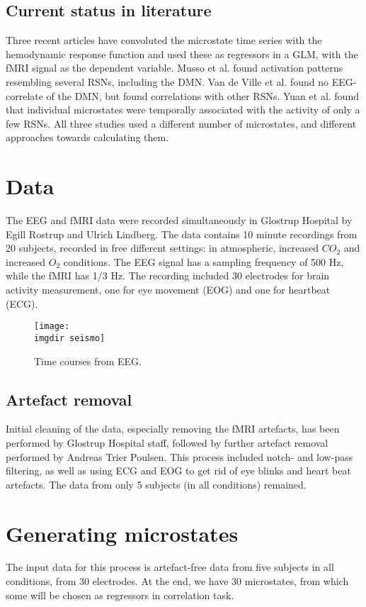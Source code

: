 \documentclass{article}
\newcommand{\imgdir}{Images/} %
\begin{document}
\subsection{Current status in literature}
Three recent articles have convoluted the microstate time series with the hemodynamic response function and used these as regressors in a GLM, with the fMRI signal as the dependent variable. Musso et al. found activation patterns resembling several RSNs, including the DMN. Van de Ville et al. found no EEG-correlate of the DMN, but found correlations with other RSNs. Yuan et al. found that individual microstates were temporally associated with the activity of only a few RSNs. All three studies used a different number of microstates, and different approaches towards calculating them.


\section{Data}
\label{sec:data}

The EEG and fMRI data were recorded simultaneously in Glostrup Hospital by Egill Rostrup and Ulrich Lindberg.
The data contains 10 minute recordings from 20 subjects, recorded in free different settings: in atmospheric, increased $CO_2$ and increased $O_2$ conditions. The EEG signal has a sampling frequency of 500 Hz, while the fMRI has 1/3 Hz. The recording included 30 electrodes for brain activity measurement, one for eye movement (EOG) and one for heartbeat (ECG). 

\begin{figure}[!ht]
    \centering
    \texttt{[image: \\imgdir seismo]}
    \caption{Time courses from EEG.}
    \label{fig:eeg}
\end{figure}

\subsection{Artefact removal}
Initial cleaning of the data, especially removing the fMRI artefacts, has been performed by Glostrup Hospital staff, followed by further artefact removal performed by Andreas Trier Poulsen. This process included notch- and low-pass filtering, as well as using ECG and EOG to get rid of eye blinks and heart beat artefacts. 
The data from only 5 subjects (in all conditions) remained.

\section{Generating microstates}
The input data for this process is artefact-free data from five subjects in all conditions, from 30 electrodes. At the end, we have 30 microstates, from which some will be chosen as regressors in correlation task. 
\end{document}
